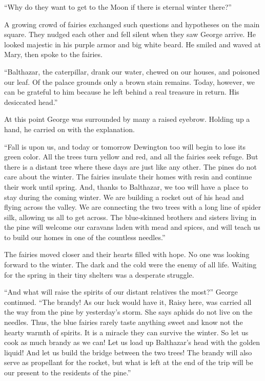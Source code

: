 \documentclass[10pt]{memoir}
\begin{document}
``Why do they want to get to the Moon if there is eternal winter there?''

A growing crowd of fairies exchanged such questions and hypotheses on the main
square. They nudged each other and fell silent when they saw George arrive. He
looked majestic in his purple armor and big white beard. He smiled and waved at
Mary, then spoke to the fairies.

``Balthazar, the caterpillar, drank our water, chewed on our houses, and
poisoned our leaf. Of the palace grounds only a brown stain remains. Today,
however, we can be grateful to him because he left behind a real treasure in
return. His desiccated head.''

At this point George was surrounded by many a raised eyebrow. Holding up a
hand, he carried on with the explanation.

``Fall is upon us, and today or tomorrow Dewington too will begin to lose its
green color. All the trees turn yellow and red, and all the fairies seek
refuge. But there is a distant tree where these days are just like any other.
The pines do not care about the winter. The fairies insulate their homes with
resin and continue their work until spring. And, thanks to Balthazar, we too
will have a place to stay during the coming winter. We are building a rocket
out of his head and flying across the valley. We are connecting the two trees
with a long line of spider silk, allowing us all to get across. The
blue-skinned brothers and sisters living in the pine will welcome our caravans
laden with mead and spices, and will teach us to build our homes in one of the
countless needles.''

The fairies moved closer and their hearts filled with hope. No one was looking
forward to the winter. The dark and the cold were the enemy of all life.
Waiting for the spring in their tiny shelters was a desperate struggle.

``And what will raise the spirits of our distant relatives the most?'' George
continued. ``The brandy! As our luck would have it, Raisy here, was carried all
the way from the pine by yesterday's storm. She says aphids do not live on the
needles. Thus, the blue fairies rarely taste anything sweet and know not the
hearty warmth of spirits. It is a miracle they can survive the winter. So let
us cook as much brandy as we can! Let us load up Balthazar's head with the
golden liquid! And let us build the bridge between the two trees! The brandy
will also serve as propellant for the rocket, but what is left at the end of
the trip will be our present to the residents of the pine.''
\end{document}

